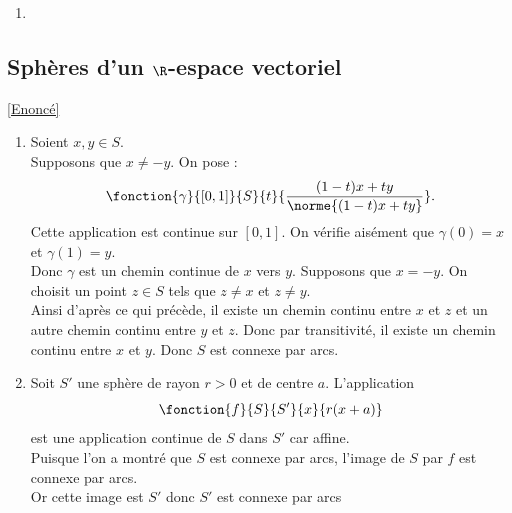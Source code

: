 \documentclass{book}
\begin{document}
\begin{enumerate}[leftmargin=*]
\begin{enumerate}[label=\alph*.]
			Ensuite, si $x,y\in C_\varepsilon$ alors $[x,y]\in C_\varepsilon$ donc $C_\varepsilon$ est connexe par arcs.\\
			Enfin on a clairement $U=\displaystyle\bigsqcup_{\varepsilon\in S}C_\varepsilon$.\\
			Ainsi $\R^n\backslash\displaystyle\bigcup_{i=1}^r\ker f_i$ a $|S|=2^r$ composantes connexes par arcs.
			\item Montrons que $U$ est connexe par arcs. Soient $x\ne y\in U$. L'application
			$$\fonction{P}{\C}{\C}{z}{\displaystyle\prod_{i=1}^rf_i((1-z)x+zy)}$$
			est polynomiale donc s'annule un nombre fini de fois et de plus, $P(0)\ne 0$ et $P(1)\ne 0$. Or on sait que $\C$ privé d'un nombre fini de points est connexe par arcs (cf.\ref{Connexité de l'espace}). Donc il existe un chemin continu $\gamma$ de 0 à 1 tel que $P\circ \gamma$ ne s'annule pas. $\tilde\gamma:t\mapsto (1-\gamma(t))x+\gamma(t)y$ est donc un chemin continue de $x$ à $y$ à valeurs dans $U$.
		\end{enumerate}
		\item 
	\end{enumerate}
	
	\subsection{Sphères d'un $\R$-espace vectoriel }
	\label{sec:spheres-dun-r-espace-vectoriel}
	\textcolor{blue}{\hyperref[Sphères d'un R espace vectoriel]{[Enoncé]}}\\
	\begin{enumerate}[leftmargin=*]
	\item Soient \(x,y\in S\).\\
	Supposons que $x\ne -y$.
	On pose :
	\[
	\fonction{\gamma}{[0,1]}{S}{t}{\displaystyle\frac{(1-t)x+ty}{\norme{(1-t)x+ty}}} .
	\]
	Cette application est continue sur $[0,1]$.
	On vérifie aisément que $\gamma(0)=x$ et $\gamma(1)=y$.\\
	Donc $\gamma$ est un chemin continue de $x$ vers $y$.
	Supposons que $x=-y$.
	On choisit un point $z\in S$ tels que $z\ne x$ et $z\ne y$.\\
	Ainsi d'après ce qui précède, il existe un chemin continu entre $x$ et $z$ et un autre chemin continu entre $y$ et $z$. Donc par transitivité, il existe un chemin continu entre $x$ et $y$.
	Donc $S$ est connexe par arcs.
	\item Soit $S'$ une sphère de rayon $r>0$ et de centre $a$.
	L'application \[\fonction{f}{S}{S'}{x}{r(x+a)}\] est une application continue de $S$ dans $S'$ car affine.\\
	Puisque l'on a montré que $S$ est connexe par arcs, l'image de $S$ par $f$ est connexe par arcs.\\
	Or cette image est $S'$ donc $S'$ est connexe par arcs
	\end{enumerate}
	
\end{document}
